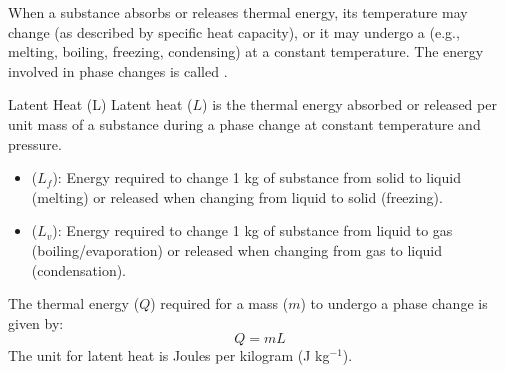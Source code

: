 When a substance absorbs or releases thermal energy, its temperature may change (as described by specific heat capacity), or it may undergo a  (e.g., melting, boiling, freezing, condensing) at a constant temperature. The energy involved in phase changes is called .

\begin{keyconcept}{Latent Heat (L)}
Latent heat (\(L\)) is the thermal energy absorbed or released per unit mass of a substance during a phase change at constant temperature and pressure.
\begin{itemize}
    \item {} (\(L_f\)): Energy required to change 1 kg of substance from solid to liquid (melting) or released when changing from liquid to solid (freezing).
    \item {} (\(L_v\)): Energy required to change 1 kg of substance from liquid to gas (boiling/evaporation) or released when changing from gas to liquid (condensation).
\end{itemize}
The thermal energy (\(Q\)) required for a mass (\(m\)) to undergo a phase change is given by:
\begin{equation}
Q = mL
\label{eq:latent_heat}
\end{equation}
The unit for latent heat is Joules per kilogram (J kg\(^{-1}\)).
\end{keyconcept}



